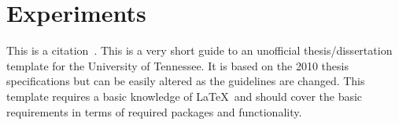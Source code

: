 \chapter{Experiments} \label{ch:chapter2}

This is a citation~\cite{utk:idr2016optimization}.
This is a very short guide to an unofficial thesis/dissertation template for the University of Tennessee. It is based on the 2010 thesis specifications but can be easily altered as the guidelines are changed. This template requires a basic knowledge of \LaTeX\ and should cover the basic requirements in terms of required packages and functionality.
